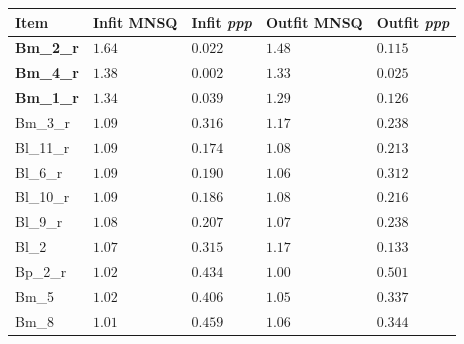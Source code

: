 \documentclass[
  man,
  floatsintext,
  longtable,
  nolmodern,
  notxfonts,
  notimes,
  colorlinks=true,linkcolor=blue,citecolor=blue,urlcolor=blue]{apa7}
\begin{document}
\begin{table}
\begin{longtable}[]{@{}
  >{\raggedright\arraybackslash}p{}
  >{\raggedleft\arraybackslash}p{}
  >{\raggedleft\arraybackslash}p{}
  >{\raggedleft\arraybackslash}p{}
  >{\raggedleft\arraybackslash}p{}@{}}
\toprule\noalign{}
\begin{minipage}[b]{\linewidth}\raggedright
Item
\end{minipage} & \begin{minipage}[b]{\linewidth}\raggedleft
Infit MNSQ
\end{minipage} & \begin{minipage}[b]{\linewidth}\raggedleft
Infit \emph{ppp}
\end{minipage} & \begin{minipage}[b]{\linewidth}\raggedleft
Outfit MNSQ
\end{minipage} & \begin{minipage}[b]{\linewidth}\raggedleft
Outfit \emph{ppp}
\end{minipage} \\
\midrule\noalign{}
\endhead
\bottomrule\noalign{}
\endlastfoot
\textbf{Bm\_2\_r} & \(\mathbf{1.64}\) & \(\mathbf{0.022}\) &
\(\mathbf{1.48}\) & \(\mathbf{0.115}\) \\
\textbf{Bm\_4\_r} & \(\mathbf{1.38}\) & \(\mathbf{0.002}\) &
\(\mathbf{1.33}\) & \(\mathbf{0.025}\) \\
\textbf{Bm\_1\_r} & \(\mathbf{1.34}\) & \(\mathbf{0.039}\) &
\(\mathbf{1.29}\) & \(\mathbf{0.126}\) \\
Bm\_3\_r & \(1.09\) & \(0.316\) & \(1.17\) & \(0.238\) \\
Bl\_11\_r & \(1.09\) & \(0.174\) & \(1.08\) & \(0.213\) \\
Bl\_6\_r & \(1.09\) & \(0.190\) & \(1.06\) & \(0.312\) \\
Bl\_10\_r & \(1.09\) & \(0.186\) & \(1.08\) & \(0.216\) \\
Bl\_9\_r & \(1.08\) & \(0.207\) & \(1.07\) & \(0.238\) \\
Bl\_2 & \(1.07\) & \(0.315\) & \(1.17\) & \(0.133\) \\
Bp\_2\_r & \(1.02\) & \(0.434\) & \(1.00\) & \(0.501\) \\
Bm\_5 & \(1.02\) & \(0.406\) & \(1.05\) & \(0.337\) \\
Bm\_8 & \(1.01\) & \(0.459\) & \(1.06\) & \(0.344\) \\

\end{longtable}
\end{table}
\end{document}
